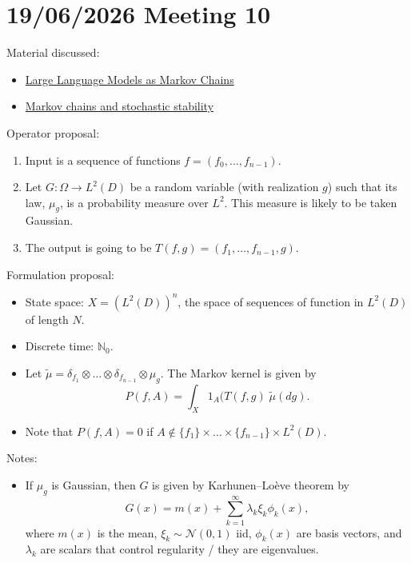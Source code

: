 \documentclass{article}
\begin{document}
\section{19/06/2026 Meeting 10}
Material discussed:
\begin{itemize}
    \item \href{https://arxiv.org/abs/2410.02724}{Large Language Models as Markov Chains}
    \item \href{https://www.cambridge.org/core/books/markov-chains-and-stochastic-stability/E2B82BFB409CD2F7D67AFC5390C565EC}{Markov chains and stochastic stability}
\end{itemize}
Operator proposal:
\begin{enumerate}
    \item Input is a sequence of functions $f=(f_0,\ldots,f_{n-1})$.
    \item Let $G:\Omega \to L^2(D)$ be a random variable (with realization $g$) such that its law, $\mu_g$, is a probability measure over $L^2$. This measure is likely to be taken Gaussian.
    \item The output is going to be $T(f,g) = (f_1,\ldots,f_{n-1},g)$.
\end{enumerate}
Formulation proposal:
\begin{itemize}
    \item State space: $X = (L^2(D))^n$, the space of sequences of function in $L^2(D)$ of length $N$.
    \item Discrete time: $\mathbb N_0$.
    \item Let $\tilde \mu = \delta_{f_1} \otimes \ldots \otimes \delta_{f_{n-1}} \otimes \mu_g$. The Markov kernel is given by
    \begin{equation*}
        P(f,A) = \int_X 1_A(T(f,g)\; \tilde \mu (dg).
    \end{equation*}
    \item Note that $P(f,A) = 0$ if $A \notin \{f_1\} \times \ldots \times \{f_{n-1}\} \times L^2(D)$.
\end{itemize}
Notes:
\begin{itemize}
    \item If $\mu_g$ is Gaussian, then $G$ is given by Karhunen–Loève theorem by
    \begin{equation*}
        G(x) = m(x) +\sum_{k=1}^\infty \lambda_k \xi_k \phi_k(x),
    \end{equation*}
    where $m(x)$ is the mean, $\xi_k \sim \mathcal N(0,1)$ iid, $\phi_k(x)$ are basis vectors, and $\lambda_k$ are scalars that control regularity / they are eigenvalues.
\end{itemize}
\end{document}
